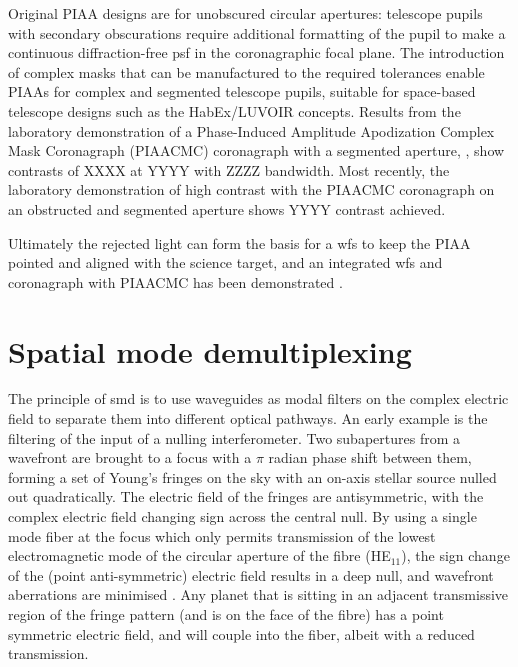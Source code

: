\documentclass[letterpaper]{ar-1col}
\begin{document}
%
Original PIAA designs are for unobscured circular apertures: telescope pupils with secondary obscurations require additional formatting of the pupil to make a continuous diffraction-free \ac{psf} in the coronagraphic focal plane.
%
The introduction of complex masks that can be manufactured to the required tolerances enable PIAAs for complex and segmented telescope pupils, suitable for space-based telescope designs such as the HabEx/LUVOIR concepts.
%
Results from the laboratory demonstration of a Phase-Induced Amplitude Apodization Complex Mask Coronagraph (PIAACMC) coronagraph with a segmented aperture, \citep{Marx21}, show contrasts of XXXX at YYYY with ZZZZ bandwidth.
%
Most recently, the laboratory demonstration of high contrast with the PIAACMC coronagraph on an obstructed and segmented aperture \citep{Belikov22} shows YYYY contrast achieved.

Ultimately the rejected light can form the basis for a \ac{wfs} to keep the PIAA pointed and aligned with the science target, and an integrated \ac{wfs} and coronagraph with PIAACMC has been demonstrated \citep{Haffert23a}.


\section{Spatial mode demultiplexing}

The principle of \ac{smd} is to use waveguides as modal filters on the complex electric field to separate them into different optical pathways.
%
An early example is the filtering of the input of a nulling interferometer.
%
Two subapertures from a wavefront are brought to a focus with a $\pi$ radian phase shift between them, forming a set of Young's fringes on the sky with an on-axis stellar source nulled out quadratically.
%
The electric field of the fringes are antisymmetric, with the complex electric field changing sign across the central null.
%
By using a single mode fiber at the focus  which only permits transmission of the lowest electromagnetic mode of the circular aperture of the fibre (HE$_{11}$), the sign change of the (point anti-symmetric) electric field results in a deep null, and wavefront aberrations are minimised \citet{Serabyn06,Haguenauer06}.
%
Any planet that is sitting in an adjacent transmissive region of the fringe pattern (and is on the face of the fibre) has a point symmetric electric field, and will couple into the fiber, albeit with a reduced transmission.
\end{document}
